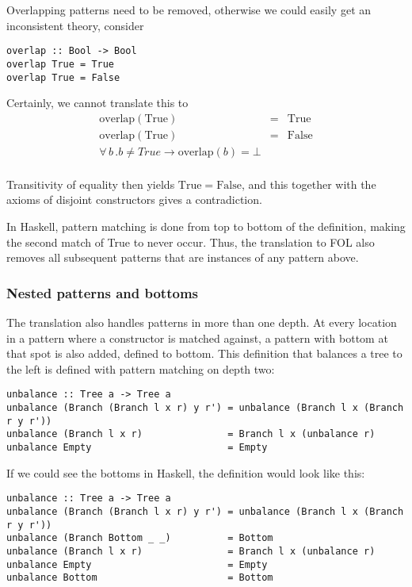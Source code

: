 Overlapping patterns need to be removed, otherwise we could easily get
an inconsistent theory, consider

\begin{verbatim}
overlap :: Bool -> Bool
overlap True = True
overlap True = False
\end{verbatim}

Certainly, we cannot translate this to
\begin{align*}
\mathrm{overlap}(\mathrm{True}) & = & \mathrm{True} \\
\mathrm{overlap}(\mathrm{True}) & = & \mathrm{False} \\
\forall \, b \, . b \neq True \rightarrow \mathrm{overlap}(b) = \bot \\
\end{align*}

Transitivity of equality then yields $\mathrm{True} = \mathrm{False}$,
and this together with the axioms of disjoint constructors gives a
contradiction.

In Haskell, pattern matching is done from top to bottom of the
definition, making the second match of True to never occur. Thus, the
translation to FOL also removes all subsequent patterns that are
instances of any pattern above.

\subsubsection{Nested patterns and bottoms}

The translation also handles patterns in more than one depth. At every
location in a pattern where a constructor is matched against, a
pattern with bottom at that spot is also added, defined to
bottom. This definition that balances a tree to the left is defined
with pattern matching on depth two:

\begin{verbatim}
unbalance :: Tree a -> Tree a
unbalance (Branch (Branch l x r) y r') = unbalance (Branch l x (Branch r y r'))
unbalance (Branch l x r)               = Branch l x (unbalance r)
unbalance Empty                        = Empty
\end{verbatim}

If we could see the bottoms in Haskell, the definition would look like this:

\begin{verbatim}
unbalance :: Tree a -> Tree a
unbalance (Branch (Branch l x r) y r') = unbalance (Branch l x (Branch r y r'))
unbalance (Branch Bottom _ _)          = Bottom
unbalance (Branch l x r)               = Branch l x (unbalance r)
unbalance Empty                        = Empty
unbalance Bottom                       = Bottom
\end{verbatim}

